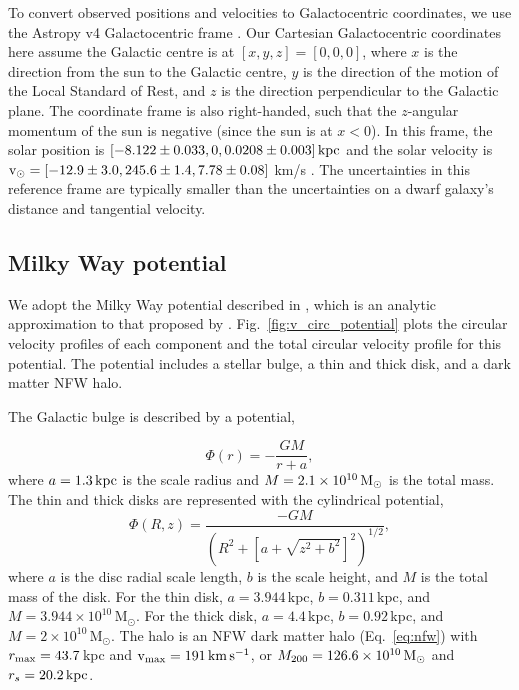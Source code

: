 To convert observed positions and velocities to Galactocentric
coordinates, we use the Astropy v4 Galactocentric frame
\citep{astropycollaboration+2022}. Our Cartesian Galactocentric
coordinates here assume the Galactic centre is at
\([x, y, z] = [0,0,0]\), where \(x\) is the direction from the sun to
the Galactic centre, \(y\) is the direction of the motion of the Local
Standard of Rest, and \(z\) is the direction perpendicular to the
Galactic plane. The coordinate frame is also right-handed, such that the
\(z\)-angular momentum of the sun is negative (since the sun is at
\(x<0\)). In this frame, the solar position is
\([-8.122 \pm 0.033, 0, 0.0208 \pm 0.003]\, {\rm kpc}\)
\citep{gravitycollaboration+2018, bennett+bovy2019} and the solar
velocity is \({\rm v}_\odot = [-12.9 \pm 3.0, 245.6 \pm 1.4, 7.78 \pm 0.08]\)
km/s
\citep{reid+brunthaler2004, drimmel+poggio2018, gravitycollaboration+2018}.
The uncertainties in this reference frame are typically smaller than the
uncertainties on a dwarf galaxy's distance and tangential velocity.

\subsection{Milky Way potential}\label{milky-way-potential}

We adopt the Milky Way potential described in \citet{EP2020}, which is
an analytic approximation to that proposed by \citet{mcmillan2011}.
Fig.~\ref{fig:v_circ_potential} plots the circular velocity profiles of
each component and the total circular velocity profile for this
potential. The potential includes a stellar bulge, a thin and thick
disk, and a dark matter NFW halo.

The Galactic bulge is described by a \citet{hernquist1990} potential,

\begin{equation}{
\Phi(r) = - \frac{GM}{r + a},
}\end{equation} where \(a=1.3\,{\rm kpc}\) is the scale radius and
\(M=2.1 \times 10^{10}\,{\rm M}_{\odot}\) is the total mass. The thin and thick
disks are represented with the \citet{miyamoto+nagai1975} cylindrical
potential, \begin{equation}{
\Phi(R, z) = \frac{-GM}{\left(R^2 + \left[a + \sqrt{z^2 + b^2}\right]^{2}\right)^{1/2}},
}\end{equation} where \(a\) is the disc radial scale length, \(b\) is
the scale height, and \(M\) is the total mass of the disk. For the thin
disk, \(a=3.944\,\)kpc, \(b=0.311\,\)kpc, and
\(M=3.944\times10^{10}\,\)M\(_\odot\). For the thick disk,
\(a=4.4\,\)kpc, \(b=0.92\,\)kpc, and \(M=2\times10^{10}\,\)M\(_\odot\).
The halo is an NFW dark matter halo (Eq.~\ref{eq:nfw}) with
\(r_{\rm max} = 43.7\,\)kpc and \({\rm v}_{\rm max} = 191\,{\rm km\,s^{-1}}\), or
\(M_{200} = 126.6\times 10^{10}\,{\rm M}_{\odot}\) and \(r_s=20.2\,{\rm kpc}\).

